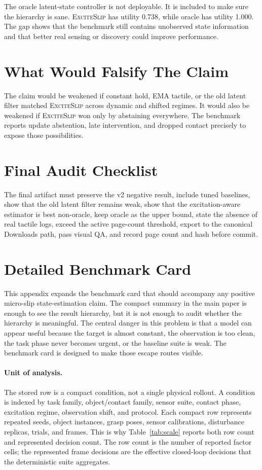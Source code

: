 \documentclass{article}
\newcommand{\method}{\textsc{ExciteSlip}\xspace}
\begin{document}
The oracle latent-state controller is not deployable. It is included to make sure the hierarchy is sane. \method has utility 0.738, while oracle has utility 1.000. The gap shows that the benchmark still contains unobserved state information and that better real sensing or discovery could improve performance.

\section{What Would Falsify The Claim}

The claim would be weakened if constant hold, EMA tactile, or the old latent filter matched \method across dynamic and shifted regimes. It would also be weakened if \method won only by abstaining everywhere. The benchmark reports update abstention, late intervention, and dropped contact precisely to expose those possibilities.

\section{Final Audit Checklist}

The final artifact must preserve the v2 negative result, include tuned baselines, show that the old latent filter remains weak, show that the excitation-aware estimator is best non-oracle, keep oracle as the upper bound, state the absence of real tactile logs, exceed the active page-count threshold, export to the canonical Downloads path, pass visual QA, and record page count and hash before commit.

\section{Detailed Benchmark Card}

This appendix expands the benchmark card that should accompany any positive micro-slip state-estimation claim. The compact summary in the main paper is enough to see the result hierarchy, but it is not enough to audit whether the hierarchy is meaningful. The central danger in this problem is that a model can appear useful because the target is almost constant, the observation is too clean, the task phase never becomes urgent, or the baseline suite is weak. The benchmark card is designed to make those escape routes visible.

\paragraph{Unit of analysis.}
The stored row is a compact condition, not a single physical rollout. A condition is indexed by task family, object/contact family, sensor suite, contact phase, excitation regime, observation shift, and protocol. Each compact row represents repeated seeds, object instances, grasp poses, sensor calibrations, disturbance replicas, trials, and frames. This is why Table~\ref{tab:scale} reports both row count and represented decision count. The row count is the number of reported factor cells; the represented frame decisions are the effective closed-loop decisions that the deterministic suite aggregates.
\end{document}
